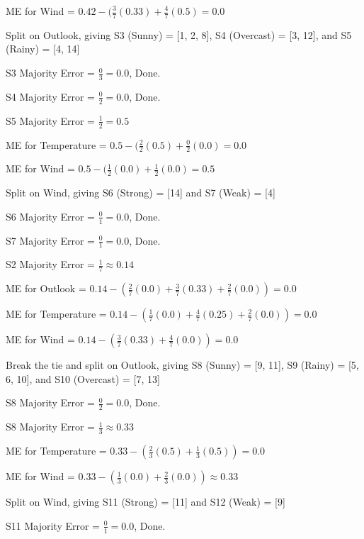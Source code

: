 \documentclass[12pt, fullpage,letterpaper]{article}
\begin{document}
\begin{enumerate}
\begin{enumerate}
\begin{framed}
		ME for Wind = $0.42 - (\frac{3}{7}(0.33) + \frac{4}{7}(0.5) = 0.0$
		
		Split on Outlook, giving S3 (Sunny) = [1, 2, 8], S4 (Overcast) = [3, 12], and S5 (Rainy) = [4, 14]
		
		\bigskip
		
		S3 Majority Error = $\frac{0}{3} = 0.0$, Done.
		
		S4 Majority Error = $\frac{0}{2} = 0.0$, Done.
		
		\bigskip
		
		S5 Majority Error = $\frac{1}{2} = 0.5$
		
		ME for Temperature = $0.5 - (\frac{2}{2}(0.5) + \frac{0}{2}(0.0) = 0.0$
		
		ME for Wind = $0.5 - (\frac{1}{2}(0.0) + \frac{1}{2}(0.0) = 0.5$
		
		Split on Wind, giving S6 (Strong) = [14] and S7 (Weak) = [4]
		
		\bigskip
		
		S6 Majority Error = $\frac{0}{1} = 0.0$, Done.
		
		S7 Majority Error = $\frac{0}{1} = 0.0$, Done.
		
		\bigskip
		
		S2 Majority Error = $\frac{1}{7} \approx 0.14$
		
		ME for Outlook = $0.14 - (\frac{2}{7}(0.0) + \frac{3}{7}(0.33) + \frac{2}{7}(0.0)) = 0.0$
		
		ME for Temperature = $0.14 - (\frac{1}{7}(0.0) + \frac{4}{7}(0.25) + \frac{2}{7}(0.0)) = 0.0$
		
		ME for Wind = $0.14 - (\frac{3}{7}(0.33) + \frac{4}{7}(0.0)) = 0.0$
		
		Break the tie and split on Outlook, giving S8 (Sunny) = [9, 11], S9 (Rainy) = [5, 6, 10], and S10 (Overcast) = [7, 13]
		
		\bigskip
		
		S8 Majority Error = $\frac{0}{2} = 0.0$, Done.
		
		\bigskip
		
		S8 Majority Error = $\frac{1}{3} \approx 0.33$
		
		ME for Temperature = $0.33 - (\frac{2}{3}(0.5) + \frac{1}{3}(0.5)) = 0.0$
		
		ME for Wind = $0.33 - (\frac{1}{3}(0.0) + \frac{2}{3}(0.0)) \approx 0.33$
		
		Split on Wind, giving S11 (Strong) = [11] and S12 (Weak) = [9]
		
		\bigskip
		
		S11 Majority Error = $\frac{0}{1} = 0.0$, Done.
		

\end{framed}
\end{enumerate}
\end{enumerate}
\end{document}
